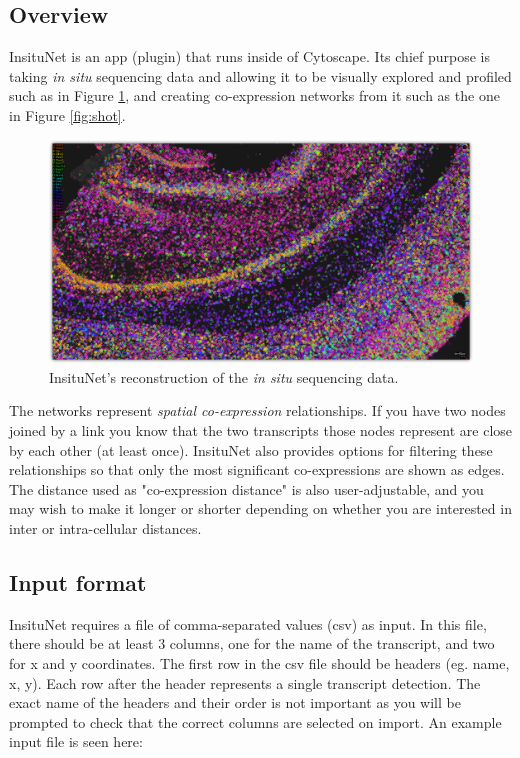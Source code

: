 \documentclass[a4paper,12pt]{article}
\begin{document}
\subsection{Overview}
InsituNet is an app (plugin) that runs inside of Cytoscape. Its chief purpose is taking \emph{in situ} sequencing data and allowing it to be visually explored and profiled such as in Figure \ref{fig:recon}, and creating co-expression networks from it such as the one in Figure \ref{fig:shot}.
\begin{figure}[h]
	\caption{InsituNet's reconstruction of the \emph{in situ} sequencing data.}\label{fig:recon}
	\centering
	\includegraphics[width=\textwidth]{reconstruction-shadow}
\end{figure}

The networks represent \emph{spatial co-expression} relationships. If you have two nodes joined by a link you know that the two transcripts those nodes represent are close by each other (at least once). InsituNet also provides options for filtering these relationships so that only the most significant co-expressions are shown as edges. The distance used as "co-expression distance" is also user-adjustable, and you may wish to make it longer or shorter depending on whether you are interested in inter or intra-cellular distances.

\subsection{Input format}
InsituNet requires a file of comma-separated values (csv) as input. In this file, there should be at least 3 columns, one for the name of the transcript, and two for x and y coordinates. The first row in the csv file should be headers (eg. name, x, y). Each row after the header represents a single transcript detection. The exact name of the headers and their order is not important as you will be prompted to check that the correct columns are selected on import. An example input file is seen here:
\end{document}
